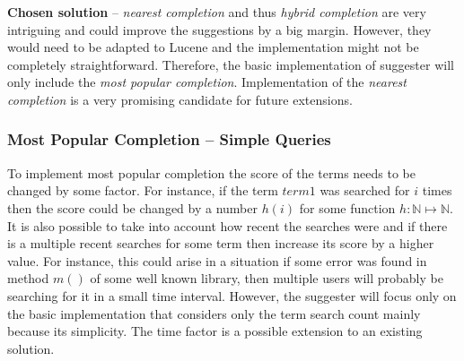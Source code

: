 \textbf{Chosen solution} – \textit{nearest completion} and thus \textit{hybrid completion} are very intriguing and could
improve the suggestions by a big margin. However, they would need to be adapted to Lucene and the implementation
might not be completely straightforward. Therefore, the basic implementation of suggester will only include the
\textit{most popular completion}. Implementation of the \textit{nearest completion} is a very promising candidate for
future extensions.

\subsubsection{Most Popular Completion – Simple Queries}

To implement most popular completion the score of the terms needs to be changed by some factor. For instance, if the term
$term1$ was searched for $i$ times then the score could be changed by a number $h(i)$ for some function $h: \mathbb{N} \mapsto \mathbb{N}$.
It is also possible to take into account how recent the searches were and if there is a multiple recent searches for some
term then increase its score by a higher value. For instance, this could arise in a situation if some error was found in
method $m()$ of some well known library, then multiple users will probably be searching for it in a small time interval.
However, the suggester will focus only on the basic implementation that considers only the term search count mainly because
its simplicity. The time factor is a possible extension to an existing solution.

